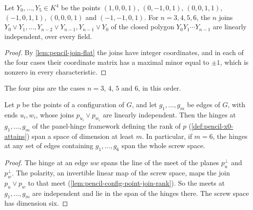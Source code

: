 \begin{lemma}
  \label{lem:pencil-chain-span-certificates}
  \leanok
  Let $Y_0, \dots, Y_5 \in K^4$ be the points $(1, 0, 0, 1)$,
  $(0, -1, 0, 1)$, $(0, 0, 1, 1)$, $(-1, 0, 1, 1)$, $(0, 0, 0, 1)$ and
  $(-1, -1, 0, 1)$. For $n = 3, 4, 5, 6$, the $n$ joins
  $Y_0 \vee Y_1, \dots, Y_{n-2} \vee Y_{n-1}, Y_{n-1} \vee Y_0$ of
  the closed polygon $Y_0 Y_1 \cdots Y_{n-1}$ are linearly independent,
  over every field.
\end{lemma}
\begin{proof}
  \leanok
  By \cref{lem:pencil-join-flat} the joins have integer coordinates, and
  in each of the four cases their coordinate matrix has a maximal minor
  equal to $\pm 1$, which is nonzero in every characteristic.
\end{proof}

\begin{fmlnote}
  The four pins are the cases $n = 3$, $4$, $5$ and $6$, in this order.
\end{fmlnote}

\begin{lemma}
  \label{lem:pencil-ear-hinge-span}
  \leanok
  Let $p$ be the points of a configuration of $G$, and let
  $g_1, \dots, g_m$ be edges of $G$, with ends $u_i, w_i$, whose joins
  $p_{u_i} \vee p_{w_i}$ are linearly independent. Then the hinges at
  $g_1, \dots, g_m$ of the panel-hinge framework defining the rank of
  $p$ (\cref{def:pencil-x0-attains}) span a space of dimension at least
  $m$. In particular, if $m = 6$, the hinges at any set of edges
  containing $g_1, \dots, g_6$ span the whole screw space.
\end{lemma}
\begin{proof}
  \leanok
  The hinge at an edge $uw$ spans the line of the meet of the planes
  $p_u^{\perp}$ and $p_w^{\perp}$. The polarity, an invertible linear
  map of the screw space, maps the join $p_u \vee p_w$ to that meet
  (\cref{lem:pencil-config-point-join-rank}). So the meets at
  $g_1, \dots, g_m$ are independent and lie in the span of the hinges
  there. The screw space has dimension six.
\end{proof}

